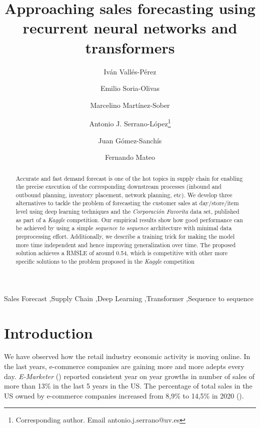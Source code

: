 \documentclass{elsarticle}
\begin{document}
	
	\begin{frontmatter}

		\title{Approaching sales forecasting using recurrent neural networks and transformers}
		
		\author[UV]{Iván Vallés-Pérez}
		\author[UV]{Emilio Soria-Olivas}
		\author[UV]{Marcelino Martínez-Sober}
		\author[UV]{Antonio J. Serrano-López\footnote{Corresponding author. Email antonio.j.serrano@uv.es}}
		\author[UV]{Juan Gómez-Sanchís}
		\author[UV]{Fernando Mateo}

		
		\address[UV]{Escola Tècnica Superior d\textsc{}Enginyeria, University of Valencia, Avenida de la Universitat s/n 46100 Burjassot, Valencia, Spain}
		\address{\{ivan.valles,
			emilio.soria,
		    marcelino.martinez, antonio.j.serrano, juan.gomez-sanchis,
		    fernando.mateo
			\}@uv.es}
		\begin{abstract}
			Accurate and fast demand forecast is one of the hot topics in supply chain for enabling the precise execution of the corresponding downstream processes (inbound and outbound planning, inventory placement, network planning, etc). We develop three alternatives to tackle the problem of forecasting the customer sales at day/store/item level using deep learning techniques and the \textit{Corporación Favorita} data set, published as part of a \textit{Kaggle} competition. Our empirical results show how good performance can be achieved by using a simple \textit{sequence to sequence} architecture with minimal data preprocessing effort. Additionally, we describe a training trick for making the model more time independent and hence improving generalization over time. The proposed solution achieves a RMSLE of around 0.54, which is competitive with other more specific solutions to the problem proposed in the \textit{Kaggle} competition
		\end{abstract}
		
		\begin{keyword}
			Sales Forecast \sep Supply Chain \sep Deep Learning \sep Transformer \sep Sequence to sequence
		\end{keyword}
		
	\end{frontmatter}
	
	\linenumbers
	
	\section{Introduction}
	We have observed how the retail industry economic activity is moving online. In the last years, e-commerce companies are gaining more and more adepts every day. \textit{E-Marketer} (\cite{emarketer2019, emarketer2020}) reported consistent year on year growths in number of sales of more than 13\% in the last 5 years in the US. The percentage of total sales in the US owned by e-commerce companies increased from 8,9\% to 14,5\% in 2020 (\cite{emarketer2019, emarketer2020}).
	
\end{document}
